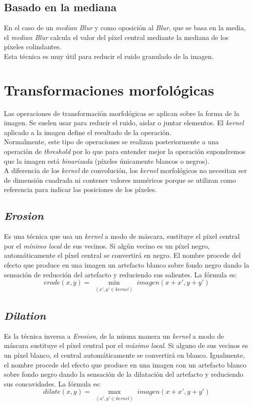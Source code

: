 \subsection{Basado en la mediana}\label{tecnica:blur-median}
En el caso de un \emph{median Blur} y como oposición al \emph{Blur},
que se basa en la media, el \emph{median Blur} calcula el valor
del píxel central mediante la mediana de los píxeles colindantes. \\
Esta técnica es muy útil para reducir el ruido granulado de la imagen.

\section{Transformaciones morfológicas}
Las operaciones de transformación morfológicas se aplican sobre la
forma de la imagen. Se suelen usar para reducir el ruido, aislar o
juntar elementos. El \emph{kernel} aplicado a la imagen define el
resultado de la operación. \\
Normalmente, este tipo de operaciones se realizan posteriormente a una
operación de \emph{threshold} por lo que para entender mejor la
operación supondremos que la imagen está \emph{binarizada} (píxeles
únicamente blancos o negros). \\
A diferencia de los \emph{kernel} de convolución, los \emph{kernel}
morfológicos no necesitan ser de dimensión cuadrada ni contener
valores numéricos porque se utilizan como referencia para indicar las
posiciones de los píxeles.
\subsection{\emph{Erosion}}
Es una técnica que usa un \emph{kernel} a modo de máscara, sustituye
el píxel central por el \emph{mínimo local} de sus vecinos. Si algún
vecino es un píxel negro, automáticamente el píxel central se
convertirá en negro. El nombre procede del efecto que produce en una
imagen un artefacto blanco sobre fondo negro dando la sensación de
reducción del artefacto y reduciendo sus salientes. La fórmula es:
\begin{equation*}
  erode(x, y) = \min_{\substack{(x', y' \in kernel)}} imagen(x + x', y + y')
\end{equation*}

\subsection{\emph{Dilation}}\label{tecnica:dilation}
Es la técnica inversa a \emph{Erosion}, de la misma manera un
\emph{kernel} a modo de máscara sustituye el píxel central por el
\emph{máximo local}. Si alguno de sus vecinos es un píxel blanco, el
central automáticamente se convertirá en blanco. Igualmente, el nombre
procede del efecto que produce en una imagen con un artefacto blanco
sobre fondo negro dando la sensación de la dilatación del artefacto y
reduciendo sus concavidades. La fórmula es:
\begin{equation*}
  dilate(x, y) = \max_{\substack{(x', y' \in kernel)}} imagen(x + x', y + y')
\end{equation*}

